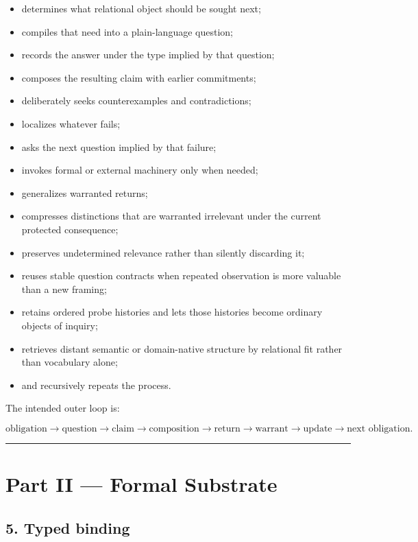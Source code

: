 \documentclass[
]{article}
\providecommand{\tightlist}{%
  \setlength{\itemsep}{0pt}\setlength{\parskip}{0pt}}
\begin{document}
\begin{itemize}
\tightlist
\item
  determines what relational object should be sought next;
\item
  compiles that need into a plain-language question;
\item
  records the answer under the type implied by that question;
\item
  composes the resulting claim with earlier commitments;
\item
  deliberately seeks counterexamples and contradictions;
\item
  localizes whatever fails;
\item
  asks the next question implied by that failure;
\item
  invokes formal or external machinery only when needed;
\item
  generalizes warranted returns;
\item
  compresses distinctions that are warranted irrelevant under the current
  protected consequence;
\item
  preserves undetermined relevance rather than silently discarding it;
\item
  reuses stable question contracts when repeated observation is more valuable
  than a new framing;
\item
  retains ordered probe histories and lets those histories become ordinary
  objects of inquiry;
\item
  retrieves distant semantic or domain-native structure by relational fit
  rather than vocabulary alone;
\item
  and recursively repeats the process.
\end{itemize}

The intended outer loop is:

\[
\boxed{
\text{obligation}
\to
\text{question}
\to
\text{claim}
\to
\text{composition}
\to
\text{return}
\to
\text{warrant}
\to
\text{update}
\to
\text{next obligation}.
}
\]

\begin{center}\rule{0.5\linewidth}{0.5pt}\end{center}

\section{Part II --- Formal Substrate}\label{part-ii-formal-substrate}

\subsection{5. Typed binding}\label{typed-binding}
\end{document}
